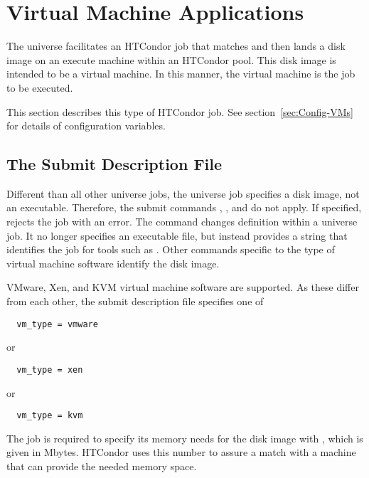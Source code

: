 \section{\label{sec:vmuniverse}Virtual Machine Applications}

The  universe facilitates an HTCondor job
that matches and then lands a disk image on an execute machine
within an HTCondor pool.
This disk image is intended to be a virtual machine.
In this manner, the virtual machine is the job to be executed.

This section describes this type of HTCondor job.
See section~\ref{sec:Config-VMs}
for details of configuration variables.

\subsection{\label{sec:vm-submitfile}The Submit Description File}

Different than all other universe jobs,
the  universe job specifies a disk image,
not an executable.
Therefore, the submit commands , ,
and  do not apply.
If specified,  rejects the job with an error.
The  command changes definition within a
 universe job.
It no longer specifies an executable file, but instead
provides a string that identifies the job for tools such
as .
Other commands specific to the type of virtual machine software
identify the disk image.

VMware, Xen, and KVM virtual machine software are supported.
As these differ from each other, the submit description file
specifies one of
\begin{verbatim}
  vm_type = vmware
\end{verbatim}
or
\begin{verbatim}
  vm_type = xen
\end{verbatim}
or
\begin{verbatim}
  vm_type = kvm
\end{verbatim}

The job is required to specify its memory needs 
for the disk image with ,
which is given in Mbytes.
HTCondor uses this number to assure a match with a machine
that can provide the needed memory space.

